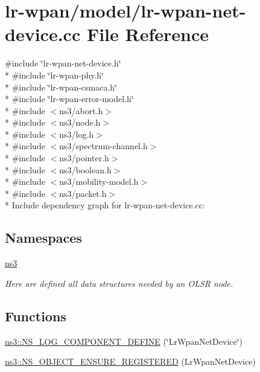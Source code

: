 \hypertarget{lr-wpan-net-device_8cc}{}\section{lr-\/wpan/model/lr-\/wpan-\/net-\/device.cc File Reference}
\label{lr-wpan-net-device_8cc}
{\ttfamily \#include \char`\"{}lr-\/wpan-\/net-\/device.\+h\char`\"{}}\\*
{\ttfamily \#include \char`\"{}lr-\/wpan-\/phy.\+h\char`\"{}}\\*
{\ttfamily \#include \char`\"{}lr-\/wpan-\/csmaca.\+h\char`\"{}}\\*
{\ttfamily \#include \char`\"{}lr-\/wpan-\/error-\/model.\+h\char`\"{}}\\*
{\ttfamily \#include $<$ns3/abort.\+h$>$}\\*
{\ttfamily \#include $<$ns3/node.\+h$>$}\\*
{\ttfamily \#include $<$ns3/log.\+h$>$}\\*
{\ttfamily \#include $<$ns3/spectrum-\/channel.\+h$>$}\\*
{\ttfamily \#include $<$ns3/pointer.\+h$>$}\\*
{\ttfamily \#include $<$ns3/boolean.\+h$>$}\\*
{\ttfamily \#include $<$ns3/mobility-\/model.\+h$>$}\\*
{\ttfamily \#include $<$ns3/packet.\+h$>$}\\*
Include dependency graph for lr-\/wpan-\/net-\/device.cc\+:
\subsection*{Namespaces}
\begin{DoxyCompactItemize}
\item 
 \hyperlink{namespacens3}{ns3}
\begin{DoxyCompactList}\small\item\em Here are defined all data structures needed by an O\+L\+SR node. \end{DoxyCompactList}\end{DoxyCompactItemize}
\subsection*{Functions}
\begin{DoxyCompactItemize}
\item 
\hyperlink{namespacens3_a5fa934f4754d001d5babb510dea94d88}{ns3\+::\+N\+S\+\_\+\+L\+O\+G\+\_\+\+C\+O\+M\+P\+O\+N\+E\+N\+T\+\_\+\+D\+E\+F\+I\+NE} (\char`\"{}Lr\+Wpan\+Net\+Device\char`\"{})
\item 
\hyperlink{namespacens3_a91efc07b918069ab71cbdc07f63e929b}{ns3\+::\+N\+S\+\_\+\+O\+B\+J\+E\+C\+T\+\_\+\+E\+N\+S\+U\+R\+E\+\_\+\+R\+E\+G\+I\+S\+T\+E\+R\+ED} (Lr\+Wpan\+Net\+Device)
\end{DoxyCompactItemize}
